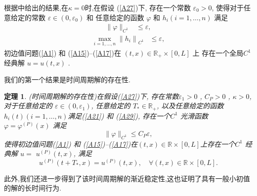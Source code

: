 \documentclass[notitlepage,cs4size,punct,oneside]{ctexrep}
\numberwithin{equation}{chapter}
\theoremstyle{mystyle}
\newtheorem{theorem}[definition]{\hspace{2em}定理}
\begin{document}
根据\cite{14,18,23}中给出的结果,在$\kappa =0$时,在假设 (\ref{A27})下, 存在一个常数 $\varepsilon_{0}>0$, 使得对于任意给定的常数 $\varepsilon \in\left(0, \varepsilon_{0}\right)$ 和 任意给定的函数 $\varphi$ 和 $h_{i}(i=1, \ldots, n)$ 满足
\begin{equation}
    \begin{aligned}
        \|\varphi\|_{C^{1}} & \leq \varepsilon,  \label{A28}
    \end{aligned}
\end{equation}
\begin{equation}
    \begin{aligned}
        \max _{i=1, \ldots, n}\left\|h_{i}\right\|_{C^{1}} & \leq \varepsilon, \label{A29}
    \end{aligned}
\end{equation}
初边值问题(\ref{A1}) 和 (\ref{A15})--(\ref{A17})在 $(t, x) \in \mathbb{R}_{+} \times[0, L]$ 上 存在一个全局$C^{1}$ 经典解 $u=u(t, x)$ .

我们的第一个结果是时间周期解的存在性.
\begin{theorem}\label{T1} (时间周期解的存在性)在假设(\ref{A27})下, 存在常数$\varepsilon_{1} > 0$ , $C_{P}>0$ , $\kappa >0$, 对于任意给定的 $\varepsilon \in \left( 0, \varepsilon_{1} \right) $, 任意给定的 $T_{*} \in \mathbb{R}_{+}$, 以及任意给定的函数 $h_{i}(t)(i=1, \ldots, n)$满足(\ref{A21}) 和 (\ref{A29}), 存在一个$C^{1}$ 光滑函数 $\varphi=\varphi^{(P)}(x)$ 满足
    \begin{equation}\label{A30}
        \|\varphi\|_{C^{1}} \leq C_{P} \varepsilon,
    \end{equation}
    使得初边值问题(\ref{A1}) 和 (\ref{A15})--(\ref{A17})在$(t, x) \in \mathbb{R} \times[0, L]$上存在一个$C^{1}$ 经典解 $u=$ $u^{(P)}(t, x)$, 满足
    \begin{equation}\label{A31}
        u^{(P)}\left(t+T_{*}, x\right)=u^{(P)}(t, x), \quad \forall(t, x) \in \mathbb{R} \times[0, L] .
    \end{equation}
\end{theorem}

此外,我们还进一步得到了该时间周期解的渐近稳定性,这也证明了具有一般小初值的解的长时间行为.
\end{document}
